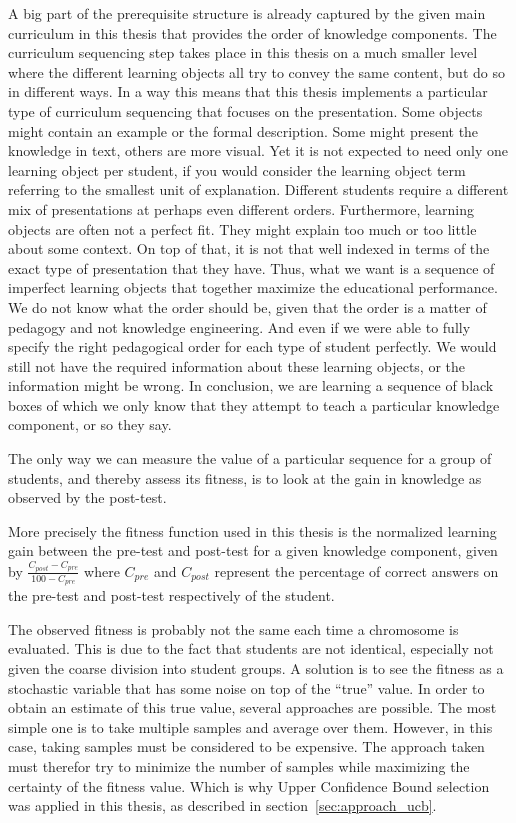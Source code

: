 A big part of the prerequisite structure is already captured by the
given main curriculum in this thesis that provides the order of
knowledge components. The curriculum sequencing step takes place
in this thesis on a much smaller level where the different learning
objects all try to convey the same content, but do so in different
ways. In a way this means that this thesis implements a particular type
of curriculum sequencing that focuses on the presentation. Some objects
might contain an example or the formal description. Some might present
the knowledge in text, others are more visual. Yet it is not expected
to need only one learning object per student, if you would consider
the learning object term referring to the smallest unit of explanation.
Different students require a different mix of presentations at perhaps
even different orders. Furthermore, learning objects are often not
a perfect fit. They might explain too much or too little about some
context. On top of that, it is not that well indexed in terms of the
exact type of presentation that they have. Thus, what we want is a
sequence of imperfect learning objects that together maximize the
educational performance. We do not know what the order should be, given
that the order is a matter of pedagogy and not knowledge engineering.
And even if we were able to fully specify the right pedagogical order
for each type of student perfectly. We would still not have the
required information about these learning objects, or the information
might be wrong. In conclusion, we are learning a sequence of black
boxes of which we only know that they attempt to teach a particular
knowledge component, or so they say.

The only way we can measure the value of a particular sequence for a
group of students, and thereby assess its fitness, is to look at the
gain in knowledge as observed by the post-test.

More precisely the fitness function used in this thesis is the normalized
learning gain between the pre-test and post-test for a given knowledge component,
given by $\frac{C_{post} - C_{pre}}{100-C_{pre}}$ where $C_{pre}$ and $C_{post}$
represent the percentage of correct answers on the pre-test and post-test
respectively of the student.

The observed fitness is probably not the same each time a chromosome
is evaluated. This is due to the fact that students are not identical,
especially not given the coarse division into student groups. A solution
is to see the fitness as a stochastic variable that has some noise on
top of the ``true'' value. In order to obtain an estimate of this true
value, several approaches are possible. The most simple one is to take
multiple samples and average over them. However, in this case, taking
samples must be considered to be expensive. The approach taken must
therefor try to minimize the number of samples while maximizing the
certainty of the fitness value. Which is why Upper Confidence Bound selection
was applied in this thesis, as described in section~\ref{sec:approach_ucb}.

